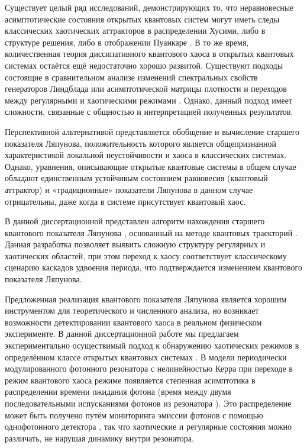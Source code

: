 Существует целый ряд исследований, демонстрирующих то, что неравновесные асимптотические состояния открытых квантовых систем могут иметь следы классических хаотических аттракторов в распределении Хусими, либо в структуре решения, либо в отображении Пуанкаре \autocite{Spiller1994, Brun1996, Hartmann2017, Ivanchenko2017, Carlo2017, Wang2018}. 
В то же время, количественная теория диссипативного квантового хаоса в открытых квантовых системах остаётся ещё недостаточно хорошо развитой. 
Существуют подходы состоящие в сравнительном анализе изменений спектральных свойств генераторов Линдблада или асимптотической матрицы плотности \autocite{Lindblad1976, book2007} и переходов между регулярными и хаотическими режимами \autocite{Hartmann2017, Ivanchenko2017, Grobe1988, Prosen2013}. 
Однако, данный подход имеет сложности, связанные с общностью и интерпретацией полученных результатов.

Перспективной альтернативой представляется обобщение и вычисление старшего показателя Ляпунова, положительность которого является общепризнанной характеристикой локальной неустойчивости и хаоса в классических системах. 
Однако, уравнения, описывающие открытые квантовые системы в общем случае обладают единственным устойчивым состоянием равновесия \autocite{book2007, Lucia2015} (квантовый аттрактор) и «традиционные» показатели Ляпунова в данном случае отрицательны, даже когда в системе присутствует квантовый хаос.

В данной диссертационной представлен алгоритм нахождения старшего квантового показателя Ляпунова \cite{Yusipov2019_2}, основанный на методе квантовых траекторий \autocite{Dum1992, Molmer1993, Plenio1998, Daley2014}.
Данная разработка позволяет выявить сложную структуру регулярных и хаотических областей, при этом переход к хаосу соответствует классическому сценарию каскадов удвоения периода, что подтверждается изменением квантового показателя Ляпунова.

Предложенная реализация квантового показателя Ляпунова является хорошим инструментом для теоретического и численного анализа, но возникает возможности детектировании квантового хаоса в реальном физическом эксперименте.
В данной диссертационной работе мы предлагаем экспериментально осуществимый подход к обнаружению хаотических режимов в определённом классе открытых квантовых системах \cite{Yusipov2020}.
В модели периодически модулированного фотонного резонатора с нелинейностью Керра \autocite{Spiller1994} при переходе в режим квантового хаоса  режиме появляется степенная асимптотика в распределении времени ожидания фотона (время между двумя последовательными испусканиями фотонов из резонатора \autocite{Vyas1989, Carmichael1989, Zhang2018}).
Это распределение может быть получено путём мониторинга эмиссии фотонов с помощью однофотонного детектора \autocite{Delteil2014, Cohen2015}, так что хаотические и регулярные состояния можно различать, не нарушая динамику внутри резонатора.

